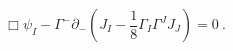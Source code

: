\begin{equation}
\Box \psi_I - \Gamma^- \partial_-
(J_I - \frac{1}{8} \Gamma_I \Gamma^J J_J ) = 0 ~.
\label{gravi-eq}
\end{equation}

